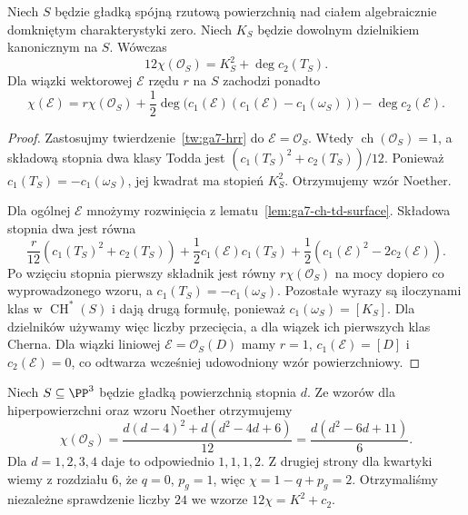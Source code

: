 \begin{twierdzenie}
\label{tw:ga7-noether}
Niech $S$ będzie gładką spójną rzutową powierzchnią
nad ciałem algebraicznie domkniętym charakterystyki zero.
Niech $K_S$ będzie dowolnym dzielnikiem kanonicznym na $S$.
Wówczas
\[
12\chi(\mathcal O_S)=K_S^2+\deg c_2(T_S).
\]
Dla wiązki wektorowej $\mathcal E$ rzędu $r$ na $S$
zachodzi ponadto
\[
\chi(\mathcal E)=r\chi(\mathcal O_S)
+\frac12\deg\bigl(c_1(\mathcal E)
(c_1(\mathcal E)-c_1(\omega_S))\bigr)
-\deg c_2(\mathcal E).
\]
\end{twierdzenie}
\begin{proof}
Zastosujmy twierdzenie~\ref{tw:ga7-hrr} do
$\mathcal E=\mathcal O_S$. Wtedy
$\operatorname{ch}(\mathcal O_S)=1$,
a składową stopnia dwa klasy Todda jest
$(c_1(T_S)^2+c_2(T_S))/12$.
Ponieważ $c_1(T_S)=-c_1(\omega_S)$, jej kwadrat
ma stopień $K_S^2$. Otrzymujemy wzór Noether.

Dla ogólnej $\mathcal E$ mnożymy rozwinięcia
z lematu~\ref{lem:ga7-ch-td-surface}. Składowa
stopnia dwa jest równa
\[
\frac r{12}(c_1(T_S)^2+c_2(T_S))
+\frac12c_1(\mathcal E)c_1(T_S)
+\frac12(c_1(\mathcal E)^2-2c_2(\mathcal E)).
\]
Po wzięciu stopnia pierwszy składnik jest równy
$r\chi(\mathcal O_S)$ na mocy dopiero co
wyprowadzonego wzoru, a
$c_1(T_S)=-c_1(\omega_S)$. Pozostałe wyrazy
są iloczynami klas w $\operatorname{CH}^*(S)$ i dają
drugą formułę, ponieważ $c_1(\omega_S)=[K_S]$.
Dla dzielników używamy więc liczby przecięcia,
a dla wiązek ich pierwszych klas Cherna.
Dla wiązki liniowej $\mathcal E=\mathcal O_S(D)$ mamy
$r=1$, $c_1(\mathcal E)=[D]$ i $c_2(\mathcal E)=0$,
co odtwarza wcześniej udowodniony wzór powierzchniowy.
\end{proof}

\begin{przyklad}
Niech $S\subseteq\PP^3$ będzie gładką powierzchnią
stopnia $d$. Ze wzorów dla hiperpowierzchni oraz
wzoru Noether otrzymujemy
\[
\chi(\mathcal O_S)=\frac{d(d-4)^2+d(d^2-4d+6)}{12}
=\frac{d(d^2-6d+11)}6.
\]
Dla $d=1,2,3,4$ daje to odpowiednio $1,1,1,2$.
Z drugiej strony dla kwartyki wiemy z rozdziału 6,
że $q=0$, $p_g=1$, więc $\chi=1-q+p_g=2$.
Otrzymaliśmy niezależne sprawdzenie liczby $24$
we wzorze $12\chi=K^2+c_2$.
\end{przyklad}

